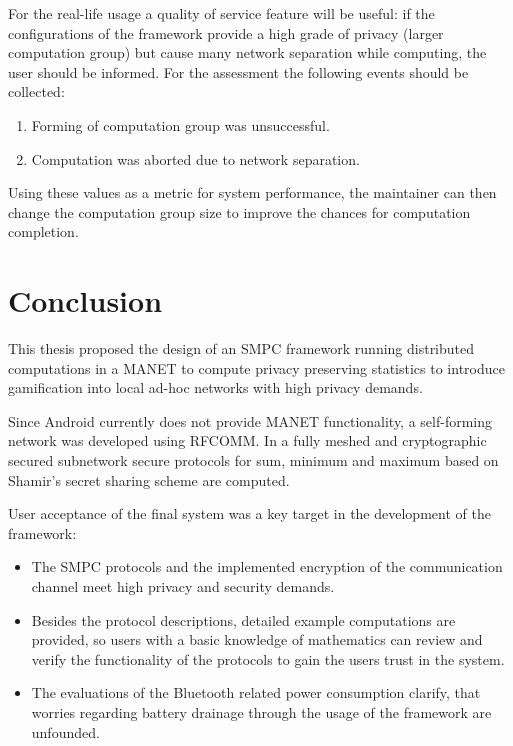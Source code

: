 For the real-life usage a quality of service feature will be useful: if the configurations of the framework provide a high grade of privacy (larger computation group) but cause many network separation while computing, the user should be informed. For the assessment the following events should be collected:
\begin{enumerate}
	\item Forming of computation group was unsuccessful.
	\item Computation was aborted due to network separation.
\end{enumerate}

Using these values as a metric for system performance, the maintainer can then change the computation group size to improve the chances for computation completion.


\FloatBarrier

\chapter{Conclusion} \label{Conclusion}
This thesis proposed the design of an \gls{SMPC} framework running distributed computations
in a \gls{MANET} to compute privacy preserving statistics to introduce gamification into local ad-hoc networks with high privacy demands.

Since Android currently does not provide \gls{MANET} functionality, a self-forming network was developed using \gls{RFCOMM}. In a fully meshed and cryptographic secured subnetwork secure protocols for sum, minimum and maximum based on Shamir's secret sharing scheme are computed.

User acceptance of the final system was a key target in the development of the framework:

\begin{itemize}
	\item The \gls{SMPC} protocols and the implemented encryption of the communication channel meet high privacy and security demands.
	\item Besides the protocol descriptions, detailed example computations are provided, so users with a basic knowledge of mathematics can review and verify the functionality of the protocols to gain the users trust in the system.
	\item The evaluations of the Bluetooth related power consumption clarify, that worries regarding battery drainage through the usage of the framework are unfounded.
\end{itemize}

